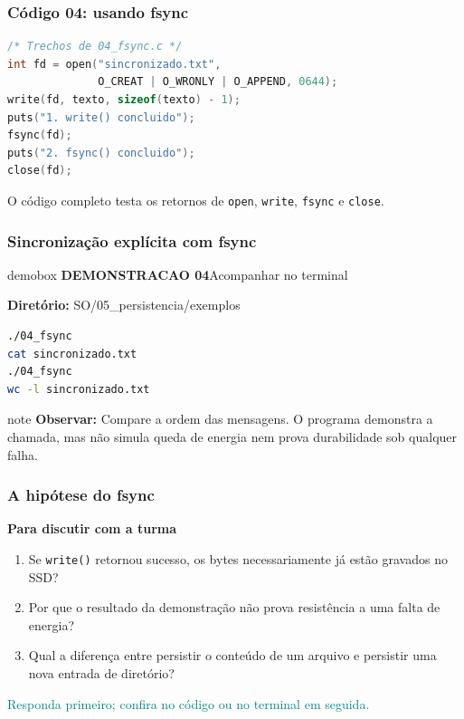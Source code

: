 \documentclass[aspectratio=169,11pt]{beamer}
\begin{document}
\begin{frame}[fragile]
\frametitle{Código 04: usando fsync}
\begin{lstlisting}[language=C]
/* Trechos de 04_fsync.c */
int fd = open("sincronizado.txt",
              O_CREAT | O_WRONLY | O_APPEND, 0644);
write(fd, texto, sizeof(texto) - 1);
puts("1. write() concluido");
fsync(fd);
puts("2. fsync() concluido");
close(fd);
\end{lstlisting}
\vfill\small\textcolor{dkblue}{O código completo testa os retornos de \texttt{open}, \texttt{write}, \texttt{fsync} e \texttt{close}.}

\end{frame}

\begin{frame}[fragile]
\frametitle{Sincronização explícita com fsync}
\begin{beamercolorbox}[wd=\textwidth,sep=3mm,rounded=true]{demobox}
{\large\bfseries DEMONSTRACAO 04}\hfill{\normalsize Acompanhar no terminal}
\end{beamercolorbox}
\vspace{2mm}
\textbf{Diretório:} {\ttfamily\small SO/05\_persistencia/exemplos}
\vspace{1mm}
\begin{lstlisting}[language=bash]
./04_fsync
cat sincronizado.txt
./04_fsync
wc -l sincronizado.txt
\end{lstlisting}
\begin{beamercolorbox}[wd=\textwidth,sep=2mm,rounded=true]{note}
\small\textbf{Observar:} Compare a ordem das mensagens. O programa demonstra a chamada, mas não simula queda de energia nem prova durabilidade sob qualquer falha.
\end{beamercolorbox}
\end{frame}

\begin{frame}
\frametitle{A hipótese do fsync}
{\large\textbf{Para discutir com a turma}}\par\medskip\begin{enumerate}\item Se \texttt{write()} retornou sucesso, os bytes necessariamente já estão gravados no SSD?
\item Por que o resultado da demonstração não prova resistência a uma falta de energia?
\item Qual a diferença entre persistir o conteúdo de um arquivo e persistir uma nova entrada de diretório?
\end{enumerate}\vfill\textcolor{teal}{\footnotesize Responda primeiro; confira no código ou no terminal em seguida.}
\end{frame}
\end{document}
